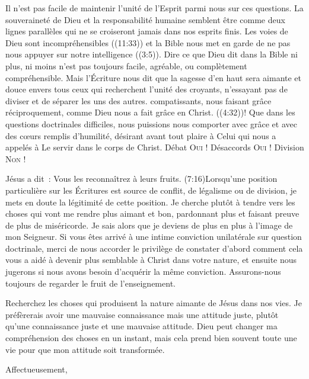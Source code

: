 \begin{pocketpar}{}
\begin{digestpar}{}
Il n'est pas facile de maintenir l'unité de l'Esprit parmi nous sur ces questions.
 La souveraineté de Dieu et la responsabilité humaine semblent être
 comme deux lignes parallèles qui ne se croiseront jamais dans nos esprits finis.
 Les voies de Dieu sont \og incompréhensibles \fg{} ((11:33))
 et la Bible nous met en garde de \og ne pas nous appuyer sur notre intelligence \fg{}
 ((3:5)).
 Dire ce que Dieu dit dans la Bible \ocadr ni plus, ni moins \fcadr{} n'est pas
 toujours facile, agréable, ou complètement compréhensible.
 Mais l'Écriture nous dit que la sagesse d'en haut sera aimante
 et douce envers tous ceux qui recherchent l'unité des croyants,
 n'essayant pas de diviser et de séparer les uns des autres.
 compatissants, nous faisant grâce réciproquement,
 comme Dieu nous a fait grâce en Christ. ((4:32))!
 Que dans les questions doctrinales difficiles, nous puissions nous comporter
 avec grâce et avec des cœurs remplis d'humilité, désirant avant tout
 plaire à Celui qui nous a appelés à Le servir dans le corps de Christ.
 Débat \ocadr \textsc{Oui} !
 Désaccords \ocadr \textsc{Oui} !
 Division \ocadr \textsc{Non} !
\end{digestpar}
\end{pocketpar}

Jésus a dit~: \og Vous les reconnaîtrez à leurs fruits. \fg{}
 (7:16)Lorsqu'une position particulière
 sur les Écritures est source de conflit, de légalisme ou de division,
 je mets en doute la légitimité de cette position.
 Je cherche plutôt à tendre vers les choses qui vont me rendre plus aimant et bon,
 pardonnant plus et faisant preuve de plus de miséricorde.
 Je sais alors que je deviens de plus en plus à l'image de mon Seigneur.
Si vous êtes arrivé à une intime conviction unilatérale sur question doctrinale,
 merci de nous accorder le privilège de constater d'abord comment cela
 vous a aidé à devenir plus semblable à Christ dans votre nature,
 et ensuite nous jugerons si nous avons besoin d'acquérir la même conviction.
 Assurons-nous toujours de regarder le fruit de l'enseignement.

\begin{pocketpar}{}
Recherchez les choses qui produisent la nature aimante de Jésus dans nos vies.
 \pocketlinebreak
 Je préfèrerais avoir une mauvaise connaissance mais une attitude juste,
 plutôt qu'une connaissance juste et une mauvaise attitude.
 Dieu peut changer ma compréhension des choses en un instant,
 mais cela prend bien souvent toute une vie pour que mon attitude
 soit transformée.
\end{pocketpar}


\nobreak
Affectueusement,

\nobreak
\signature{Chuck Smith}


\closechapter

